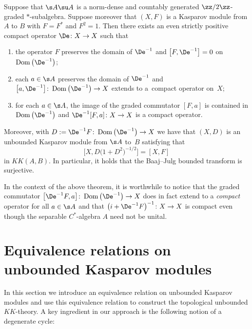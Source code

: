 \begin{Theorem}\label{t:bousur}
Suppose that $\s A \su A$ is a norm-dense and countably generated $\zz/2\zz$-graded $*$-subalgebra. Suppose moreover that $(X,F)$ is a Kasparov module from $A$ to $B$ with $F = F^*$ and $F^2 = 1$. Then there exists an even strictly positive compact operator $\De\colon X \to X$ such that
\begin{enumerate}\itemsep=0pt
\item[$1)$] the operator $F$ preserves the domain of $\De^{-1}$ and $\big[ F, \De^{-1} \big] = 0$ on $\operatorname{Dom}\big(\De^{-1}\big)$;
\item[$2)$] each $a \in \s A$ preserves the domain of $\De^{-1}$ and $\big[a,\De^{-1}\big] \colon \operatorname{Dom}\big(\De^{-1}\big) \to X$ extends to a~compact operator on~$X$;
\item[$3)$] for each $a \in \s A$, the image of the graded commutator $[F,a]$ is contained in $\operatorname{Dom}\big(\De^{-1}\big)$ and $\De^{-1}[F,a]\colon X \to X$ is a compact operator.
\end{enumerate}
Moreover, with $D := \De^{-1} F\colon \operatorname{Dom}\big(\De^{-1}\big) \to X$ we have that $(X, D)$ is an unbounded Kasparov module from $\s A$ to~$B$ satisfying that
\[
\big[ X, D\big(1 + D^2\big)^{-1/2}\big] = [X,F]
\]
in $KK(A,B)$. In particular, it holds that the Baaj--Julg bounded transform is surjective.
\end{Theorem}

In the context of the above theorem, it is worthwhile to notice that the graded commutator $\big[\De^{-1} F,a\big]\colon \operatorname{Dom}\big(\De^{-1}\big) \to X$ does in fact extend to a \emph{compact} operator for all $a \in \s A$ and that $\big(i + \De^{-1} F\big)^{-1}\colon X \to X$ is compact even though the separable $C^*$-algebra $A$ need not be unital.

\section{Equivalence relations on unbounded Kasparov modules}
In this section we introduce an equivalence relation on unbounded Kasparov modules and use this equivalence relation to construct the topological unbounded $KK$-theory. A key ingredient in our approach is the following notion of a degenerate cycle:

